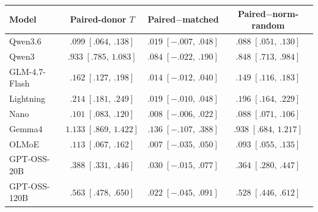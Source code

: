 \begingroup
\normalsize
\setlength{\tabcolsep}{2.5pt}
\renewcommand{\arraystretch}{1.15}
\begin{tabular*}{\linewidth}{@{\extracolsep{\fill}}lccc@{}}
\toprule
Model & Paired-donor \(T\) & Paired\(-\)matched & Paired\(-\)norm-random \\
\midrule
Qwen3.6 & \(.099\;[.064,\,.138]\) & \(.019\;[-.007,\,.048]\) & \(.088\;[.051,\,.130]\)\\[1pt]
Qwen3 & \(.933\;[.785,\,1.083]\) & \(.084\;[-.022,\,.190]\) & \(.848\;[.713,\,.984]\)\\[1pt]
GLM-4.7-Flash & \(.162\;[.127,\,.198]\) & \(.014\;[-.012,\,.040]\) & \(.149\;[.116,\,.183]\)\\[1pt]
Lightning & \(.214\;[.181,\,.249]\) & \(.019\;[-.010,\,.048]\) & \(.196\;[.164,\,.229]\)\\[1pt]
Nano & \(.101\;[.083,\,.120]\) & \(.008\;[-.006,\,.022]\) & \(.088\;[.071,\,.106]\)\\[1pt]
Gemma4 & \(1.133\;[.869,\,1.422]\) & \(.136\;[-.107,\,.388]\) & \(.938\;[.684,\,1.217]\)\\[1pt]
OLMoE & \(.113\;[.067,\,.162]\) & \(.007\;[-.035,\,.050]\) & \(.093\;[.055,\,.135]\)\\[1pt]
GPT-OSS-20B & \(.388\;[.331,\,.446]\) & \(.030\;[-.015,\,.077]\) & \(.364\;[.280,\,.447]\)\\[1pt]
GPT-OSS-120B & \(.563\;[.478,\,.650]\) & \(.022\;[-.045,\,.091]\) & \(.528\;[.446,\,.612]\)\\[1pt]
\bottomrule
\end{tabular*}
\endgroup
